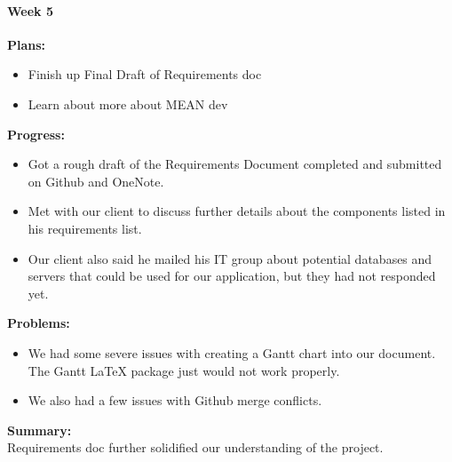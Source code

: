 \paragraph{Week 5}
\begin{adjustwidth}{2.5em}{0pt}
    \vspace{-0.5cm}\textbf{Plans:}
    \vspace{-0.5cm}
    \begin{itemize}
        \item Finish up Final Draft of Requirements doc  
        \item Learn about more about MEAN dev
    \end{itemize} 
    \vspace{-0.3cm}\textbf{Progress:}
    \vspace{-0.5cm}
    \begin{itemize}
        \item Got a rough draft of the Requirements Document completed and submitted on Github and OneNote.
        \item Met with our client to discuss further details about the components listed in his requirements list.
        \item Our client also said he mailed his IT group about potential databases and servers that could be used for our application, but they had not responded yet. 
    \end{itemize} 
    \vspace{-0.3cm}\textbf{Problems:}
    \vspace{-0.5cm}
    \begin{itemize}
        \item We had some severe issues with creating a Gantt chart into our document. The Gantt LaTeX package just would not work properly. 
		\item We also had a few issues with Github merge conflicts. 
    \end{itemize}  
    \vspace{-0.3cm}\noindent\textbf{Summary:}\\
    \noindent Requirements doc further solidified our understanding of the project.
	\end{adjustwidth} 
